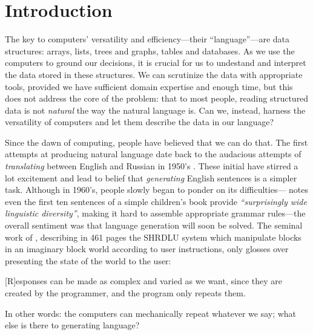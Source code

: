 \chapter{Introduction}
\label{chap:intro}
The key to computers' versatility and efficiency---their ``language''---are data structures: arrays, lists, trees and graphs, tables and databases. As we use the computers to ground our decisions, it is crucial for us to undestand and interpret the data stored in these structures. We can scrutinize the data with appropriate tools, provided we have sufficient domain expertise and enough time, but this does not address the core of the problem: that to most people, reading structured data is not \textit{natural} the way the natural language is. Can we, instead, harness the versatility of computers and let them describe the data in our language?


Since the dawn of computing, people have believed that we can do that. The first attempts at producing natural language date back to the audacious attempts of \textit{translating} between English and Russian in 1950's \cite{sheridan1955research}. These initial have stirred a lot excitement and lead to belief that \textit{generating} English sentences is a simpler task. Although in 1960's, people slowly began to ponder on its difficulties---\citet{yngve1961random} notes even the first ten sentences of a simple children's book provide \textit{``surprisingly wide linguistic diversity''}, making it hard to assemble appropriate grammar rules---the overall sentiment was that language generation will soon be solved. The seminal work of \citet{winograd1971procedures}, describing in 461 pages the SHRDLU system which manipulate blocks in an imaginary block world according to user instructions, only glosses over presenting the state of the world to the user:
\begin{pquotation}{\citealp[p.384]{winograd1971procedures}}
    [R]esponses can be made as complex and varied as we want, since they are created by the programmer, and the program only repeats them.
\end{pquotation}
In other words: the computers can mechanically repeat whatever we say; what else is there to generating language?

